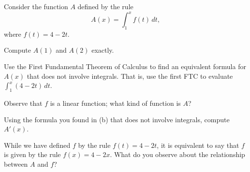 \begin{pa} \label{PA:5.2}
Consider the function $A$ defined by the rule
$$A(x) = \int_1^x f(t) \, dt,$$
where $f(t) = 4-2t$.
\ba
	\item Compute $A(1)$ and $A(2)$ exactly.
	\item Use the First Fundamental Theorem of Calculus to find an equivalent formula for $A(x)$ that does not involve integrals.  That is, use the first FTC to evaluate $\int_1^x (4-2t) \, dt$.
	\item Observe that $f$ is a linear function; what kind of function is $A$?
	\item Using the formula you found in (b) that does not involve integrals, compute $A'(x)$.
	\item While we have defined $f$ by the rule $f(t) = 4-2t$, it is equivalent to say that $f$ is given by the rule $f(x) = 4 - 2x$.  What do you observe about the relationship between $A$ and $f$?
\ea
\end{pa} 
\afterpa